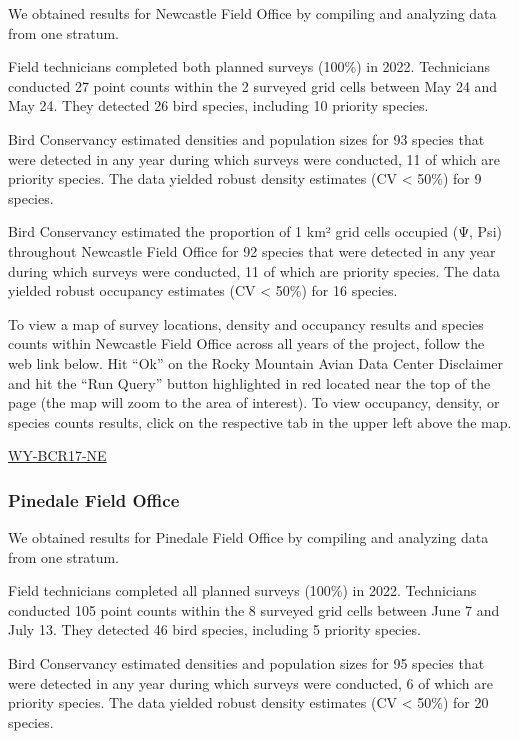 \documentclass[
  letterpaper,
  DIV=11,
  numbers=noendperiod,
  oneside]{scrreprt}
\begin{document}
We obtained results for Newcastle Field Office by compiling and
analyzing data from one stratum.

Field technicians completed both planned surveys (100\%) in 2022.
Technicians conducted 27 point counts within the 2 surveyed grid cells
between May 24 and May 24. They detected 26 bird species, including 10
priority species.

Bird Conservancy estimated densities and population sizes for 93 species
that were detected in any year during which surveys were conducted, 11
of which are priority species. The data yielded robust density estimates
(CV \textless{} 50\%) for 9 species.

Bird Conservancy estimated the proportion of 1 km² grid cells occupied
(Ψ, Psi) throughout Newcastle Field Office for 92 species that were
detected in any year during which surveys were conducted, 11 of which
are priority species. The data yielded robust occupancy estimates (CV
\textless{} 50\%) for 16 species.

To view a map of survey locations, density and occupancy results and
species counts within Newcastle Field Office across all years of the
project, follow the web link below. Hit ``Ok'' on the Rocky Mountain
Avian Data Center Disclaimer and hit the ``Run Query'' button
highlighted in red located near the top of the page (the map will zoom
to the area of interest). To view occupancy, density, or species counts
results, click on the respective tab in the upper left above the map.

\href{http://www.rmbo.org/new_site/adc/QueryWindow.aspx\#N4IgzgLgTghhCuBbEAuABCA6gTQLQCEBhAJQEYB2XAOQFF194oBTGeNAewDM0AZGAOwAmaALICYAcyaIm/CGlxoqTAO4BjGJAA2TNADEAlky3CA8p04G1TEAF8gA}{WY-BCR17-NE}

\hypertarget{pinedale-field-office}{%
\subsubsection{Pinedale Field Office}\label{pinedale-field-office}}

We obtained results for Pinedale Field Office by compiling and analyzing
data from one stratum.

Field technicians completed all planned surveys (100\%) in 2022.
Technicians conducted 105 point counts within the 8 surveyed grid cells
between June 7 and July 13. They detected 46 bird species, including 5
priority species.

Bird Conservancy estimated densities and population sizes for 95 species
that were detected in any year during which surveys were conducted, 6 of
which are priority species. The data yielded robust density estimates
(CV \textless{} 50\%) for 20 species.
\end{document}
